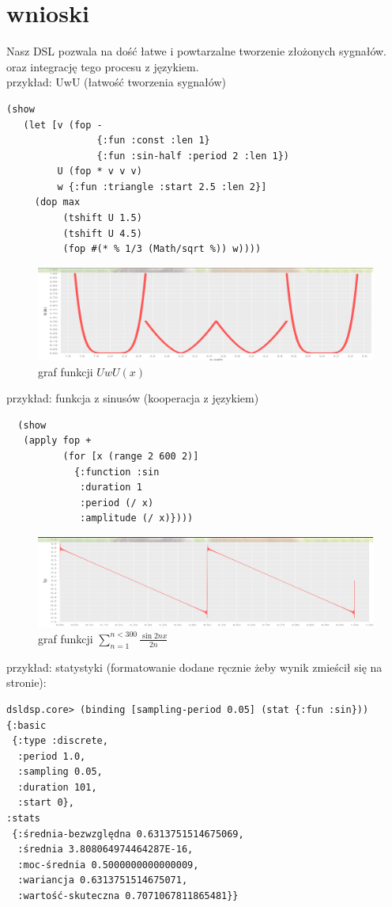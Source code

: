 \documentclass[12pt]{article}
\begin{document}
\section{wnioski}

Nasz DSL pozwala na dość łatwe i powtarzalne tworzenie złożonych sygnałów. oraz
integrację tego procesu z językiem. \\
przykład: UwU (łatwość tworzenia sygnałów)
\begin{verbatim}
(show
   (let [v (fop -
                {:fun :const :len 1}
                {:fun :sin-half :period 2 :len 1})
         U (fop * v v v)
         w {:fun :triangle :start 2.5 :len 2}]
     (dop max
          (tshift U 1.5)
          (tshift U 4.5)
          (fop #(* % 1/3 (Math/sqrt %)) w))))
\end{verbatim}
\begin{figure}[H]
	\includegraphics[width=\linewidth]{uwu.png}
	\caption{graf funkcji $UwU(x)$}
\end{figure}
przykład: funkcja z sinusów (kooperacja z językiem)
\begin{verbatim}
  (show
   (apply fop +
          (for [x (range 2 600 2)]
            {:function :sin
             :duration 1
             :period (/ x)
             :amplitude (/ x)})))
\end{verbatim}
\begin{figure}[H]
	\includegraphics[width=\linewidth]{trujkot.png}
	\caption{graf funkcji $\sum_{n=1}^{n<300} \frac{\sin 2nx}{2n}$}
\end{figure}
przykład: statystyki (formatowanie dodane ręcznie żeby wynik zmieścił się na stronie):
\begin{verbatim}
dsldsp.core> (binding [sampling-period 0.05] (stat {:fun :sin}))
{:basic
 {:type :discrete,
  :period 1.0,
  :sampling 0.05,
  :duration 101,
  :start 0},
:stats
 {:średnia-bezwzględna 0.6313751514675069,
  :średnia 3.808064974464287E-16,
  :moc-średnia 0.5000000000000009,
  :wariancja 0.6313751514675071,
  :wartość-skuteczna 0.7071067811865481}}
\end{verbatim}

\renewcommand\refname{Bibliografia}

%
\end{document}
